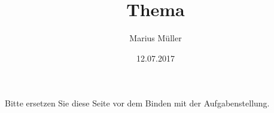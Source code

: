 \subject{Diplomarbeit}




\author{Marius M\"uller}
\title{Thema}
\date{12.07.2017}
\maketitlePLT



\newpage
\thispagestyle{empty}
\null\vfill
\begin{center}
	Bitte ersetzen Sie diese Seite vor dem Binden mit der Aufgabenstellung.
\end{center}
\vfill

